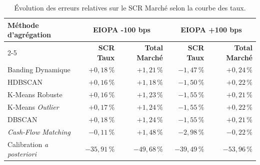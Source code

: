 \begin{table}[H]
    \centering
    \renewcommand{\arraystretch}{1.4}
    \begin{tabular}{|l|r|r||r|r|}
        \hline
        \multirow{2}{*}{\textbf{Méthode d'agrégation}} & \multicolumn{2}{c||}{\textbf{EIOPA -100 bps}} & \multicolumn{2}{c|}{\textbf{EIOPA +100 bps}} \\
        \cline{2-5}
        & \textbf{SCR Taux} & \textbf{Total Marché} & \textbf{SCR Taux} & \textbf{Total Marché} \\
        \hline
        Banding Dynamique & $+0{,}18\,\%$ & $+1{,}21\,\%$ & $-1{,}47\,\%$ & $+0{,}24\,\%$ \\
        HDBSCAN & $+0{,}16\,\%$ & $+1{,}18\,\%$ & $-1{,}50\,\%$ & $+0{,}22\,\%$ \\
        K-Means Robuste & $+0{,}16\,\%$ & $+1{,}23\,\%$ & $-1{,}55\,\%$ & $+0{,}21\,\%$ \\
        K-Means \textit{Outlier} & $+0{,}17\,\%$ & $+1{,}24\,\%$ & $-1{,}55\,\%$ & $+0{,}22\,\%$ \\
        DBSCAN & $+0{,}18\,\%$ & $+1{,}24\,\%$ & $-1{,}55\,\%$ & $+0{,}21\,\%$ \\
        \textit{Cash-Flow Matching} & $-0{,}11\,\%$ & $+1{,}48\,\%$ & $-2{,}98\,\%$ & $-0{,}22\,\%$ \\
        Calibration \textit{a posteriori} & $-35{,}91\,\%$ & $-49{,}68\,\%$ & $-39{,}49\,\%$ & $-53{,}96\,\%$ \\
        \hline
    \end{tabular}
    \caption{Évolution des erreurs relatives sur le SCR Marché selon la courbe des taux.}
    \label{tab:resultats_marche_sensibilites}
\end{table}


